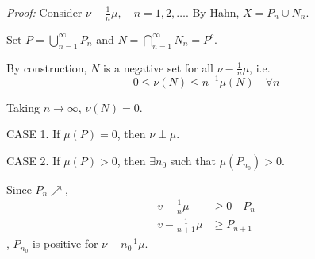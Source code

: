 \documentclass[12pt]{report}
\newcommand{\ep}{\varepsilon}
\newcommand{\M}{\mathcal{M}}
\newenvironment*{tbox}[2][gray]{
    \begin{tcolorbox}[
        parbox=false,
        colback=#1!5!white,
        colframe=#1!75!black,
        breakable,
        title={#2}
    ]}
    {\end{tcolorbox}}
\begin{document}
        \begin{tbox}{\textbf{Lemma (Dichotomy of $\perp$ and $\ll$):} Suppose $\nu$ and $\mu$ are positive, finite measures in $(X, \M)$. Then either 
            \begin{enumerate}
                \item $\mu \perp \nu$
                \item $\exists \ep > 0$, $E \in \M$ which is a positive set for $\nu - \ep \mu$
            \end{enumerate}}
            \emph{Proof:} Consider $\nu - \frac{1}{n}\mu, \quad n = 1, 2, \dots$. By Hahn, $X = P_n \cup N_n$. 

            Set $P = \bigcup_{n=1}^\infty P_n$ and $N = \bigcap_{n=1}^\infty N_n = P^c$.

            By construction, $N$ is a negative set for all $\nu - \frac{1}{n}\mu$, i.e. 
            \[0 \leq \nu(N) \leq n^{-1} \mu(N) \quad \forall n\]

            Taking $n \to \infty$, $\nu(N) = 0$.

            CASE 1. If $\mu(P) = 0$, then $\nu \perp \mu$. 

            CASE 2. If $\mu(P) > 0$, then $\exists n_0$ such that $\mu(P_{n_0}) > 0$.

            Since $P_n \nearrow$, 
            \begin{align*}
                v - \frac{1}{n}\mu &\geq 0 \quad P_n\\ 
                v - \frac{1}{n+1}\mu &\geq P_{n+1}
            \end{align*},
            $P_{n_0}$ is positive for $\nu- n_0^{-1}\mu$.
        \end{tbox}
\end{document}
